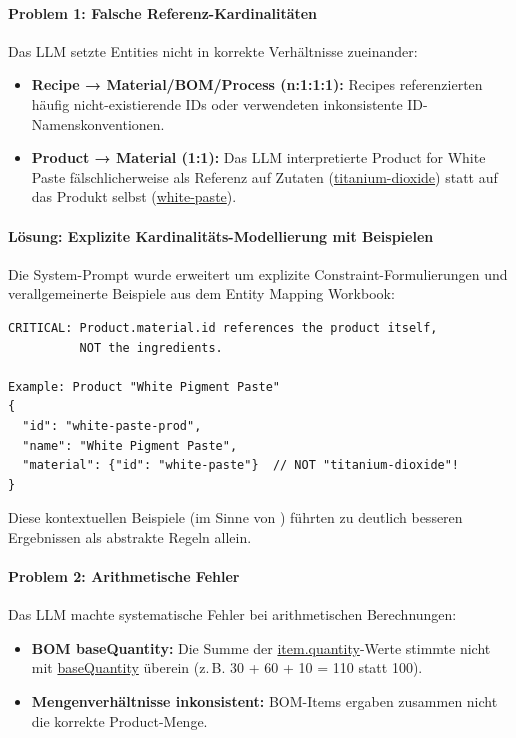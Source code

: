 \paragraph{Problem 1: Falsche Referenz-Kardinalitäten}

Das LLM setzte Entities nicht in korrekte Verhältnisse zueinander:

\begin{itemize}
    \item \textbf{Recipe → Material/BOM/Process (n:1:1:1):} Recipes referenzierten häufig nicht-existierende IDs oder verwendeten inkonsistente ID-Namenskonventionen.

    \item \textbf{Product → Material (1:1):} Das LLM interpretierte \glqq Product for White Paste\grqq{} fälschlicherweise als Referenz auf Zutaten (\url{titanium-dioxide}) statt auf das Produkt selbst (\url{white-paste}).
\end{itemize}

\paragraph{Lösung: Explizite Kardinalitäts-Modellierung mit Beispielen}

Die System-Prompt wurde erweitert um explizite Constraint-Formulierungen und verallgemeinerte Beispiele aus dem Entity Mapping Workbook:

\begin{verbatim}
CRITICAL: Product.material.id references the product itself,
          NOT the ingredients.

Example: Product "White Pigment Paste"
{
  "id": "white-paste-prod",
  "name": "White Pigment Paste",
  "material": {"id": "white-paste"}  // NOT "titanium-dioxide"!
}
\end{verbatim}

\noindent Diese kontextuellen Beispiele (im Sinne von \cite{openai:sora_android2025}) führten zu deutlich besseren Ergebnissen als abstrakte Regeln allein.

\paragraph{Problem 2: Arithmetische Fehler}

Das LLM machte systematische Fehler bei arithmetischen Berechnungen:

\begin{itemize}
    \item \textbf{BOM baseQuantity:} Die Summe der \url{item.quantity}-Werte stimmte nicht mit \url{baseQuantity} überein (z.\,B. 30 + 60 + 10 = 110 statt 100).

    \item \textbf{Mengenverhältnisse inkonsistent:} BOM-Items ergaben zusammen nicht die korrekte Product-Menge.
\end{itemize}


